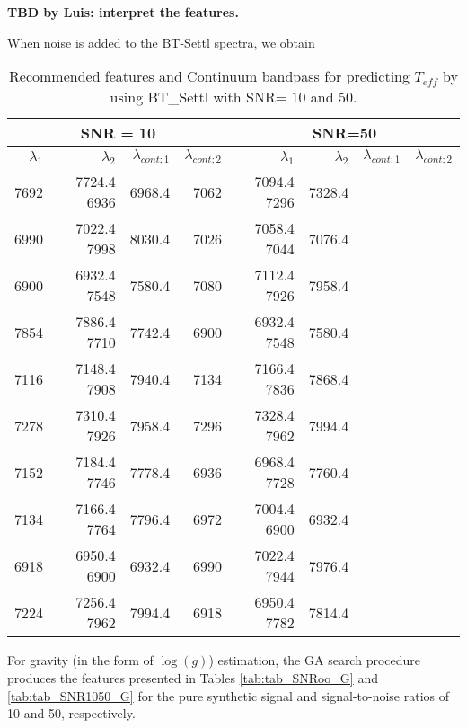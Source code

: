 {\bf TBD by Luis: interpret the features.}

When noise is added to the BT-Settl spectra, we obtain 


\begin{table}
\begin{center}
\begin{tabular}{rrrr | rrrr}
  \hline
 \multicolumn{4}{c}{SNR = 10} &  \multicolumn{4}{c}{SNR=50} \\
  \hline
$\lambda_1$ & $\lambda_2$ & $\lambda_{cont;1}$ & $\lambda_{cont;2} $ & $\lambda_1$ & $\lambda_2$ & $\lambda_{cont;1}$ & $\lambda_{cont;2} $ \\ 
  \hline
7692 & 7724.4 	6936 & 6968.4  & 7062 & 7094.4   7296 & 7328.4 \\
6990 & 7022.4 	7998 & 8030.4  & 7026 & 7058.4   7044 & 7076.4 \\
6900 & 6932.4 	7548 & 7580.4  & 7080 & 7112.4   7926 & 7958.4 \\
7854 & 7886.4 	7710 & 7742.4  & 6900 & 6932.4   7548 & 7580.4 \\
7116 & 7148.4 	7908 & 7940.4  & 7134 & 7166.4   7836 & 7868.4 \\
7278 & 7310.4 	7926 & 7958.4  & 7296 & 7328.4   7962 & 7994.4 \\
7152 & 7184.4 	7746 & 7778.4  & 6936 & 6968.4   7728 & 7760.4 \\
7134 & 7166.4 	7764 & 7796.4  & 6972 & 7004.4   6900 & 6932.4 \\
6918 & 6950.4 	6900 & 6932.4  & 6990 & 7022.4   7944 & 7976.4 \\
7224 & 7256.4 	7962 & 7994.4  & 6918 & 6950.4   7782 & 7814.4 \\

\hline
\end{tabular}
\caption {Recommended features and Continuum bandpass for predicting $ T_{eff} $ 
      by using BT\_Settl with SNR= $ 10 $ and 50.} \label{tab:tab_SNR1050_T} 
\end{center}
\end{table}

For gravity (in the form of $\log(g)$) estimation, the GA search
procedure produces the features presented in
Tables \ref{tab:tab_SNRoo_G} and \ref{tab:tab_SNR1050_G} for the pure
synthetic signal and signal-to-noise ratios of 10 and 50,
respectively.

